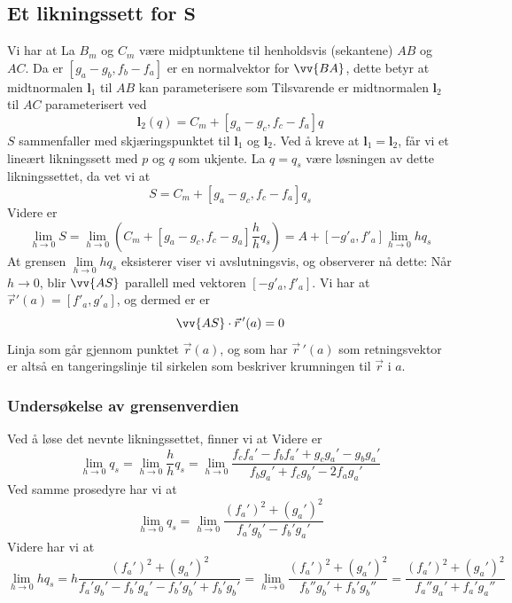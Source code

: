 \subsection*{Et likningssett for $\bm S $}
Vi har at
La $ B_m $ og $ C_m $ være midptunktene til henholdsvis  (sekantene) $ AB $ og $ AC $. Da er
$ [g_a-g_b,f_b-f_a] $ er en normalvektor for $ \vv{BA} $, dette betyr at midtnormalen $\bm l_1 $ til $ AB $ kan parameterisere som
Tilsvarende er midtnormalen $\bm l_2 $ til $ AC $ parameterisert ved
\[ {\bm l_2(q)}=C_m+[g_a-g_c,f_c-f_a] q \]
$ S $ sammenfaller med skjæringspunktet til $\bm l_1 $ og $\bm l_2 $.
Ved å kreve at $\bm l_1= \bm l_2 $, får vi et lineært likningssett med $ p $ og $ q $ som ukjente. La $ q=q_s $ være løsningen av dette likningssettet, da vet vi at
\[ S=C_m+[g_a-g_c, f_c-f_a]q_s\]
Videre er
\[ \lim\limits_{h\to0}S=\lim\limits_{h\to0}\left(C_m+[g_a-g_c, f_c-g_a]\frac{h}{h}q_s\right)=A+[-g'_a, f'_a]\lim\limits_{h\to 0}h q_s \]
At grensen $ \lim\limits_{h\to 0}h q_s $ eksisterer viser vi avslutningsvis, og observerer nå dette: Når $ h\to0 $, blir $ \vv{AS} $ parallell med vektoren $ [-g'_a, f'_a] $. Vi har at $ \vec{r}'(a)=[f'_a, g'_a] $, og dermed er er 
\[ \vv{AS}\cdot \vec{r}\,'(a)=0 \]
Linja som går gjennom punktet $ \vec{r}(a) $, og som har $ \vec{r}\,'(a) $ som retningsvektor er altså en tangeringslinje til sirkelen som beskriver krumningen til $ \vec{r} $ i $ a $. \vsk

\subsubsection{Undersøkelse av grensenverdien}
Ved å løse det nevnte likningssettet, finner vi at
Videre er
\[ \lim\limits_{h\to 0} q_s=\lim\limits_{h\to 0}\frac{h}{h}q_s=\lim\limits_{h\to 0}\frac{f_cf_a'-f_bf_a'+g_cg_a'-g_bg_a'}{f_bg_a'+f_cg_b'-2f_ag_a'} \]
Ved samme prosedyre har vi at
\[\lim\limits_{h\to 0}q_s= \lim\limits_{h\to 0} \frac{(f_a')^2+(g_a')^2}{f_a'g_b'-f_b'g_a'} \]
Videre har vi at {\footnotesize
\[ \lim\limits_{h\to 0}h q_s= h\frac{(f_a')^2+(g_a')^2}{f_a'g_b'-f_b'g_a'-f_b'g_b'+f_b'g_b'}=\lim\limits_{h\to 0}\frac{(f_a')^2+(g_a')^2}{f_b''g_b'+f_b'g_b''}=\frac{(f_a')^2+(g_a')^2}{f_a''g_a'+f_a'g_a''} \]}
